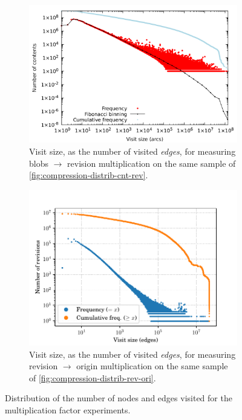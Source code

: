 \begin{figure}
    \begin{subfigure}{.49\textwidth}
        \centering
        \includegraphics[width=\linewidth]{img/compression/distributions/contents_arc_size}
        \caption{Visit size, as the number of visited \emph{edges}, for
            measuring blobs $\to$ revision multiplication on the same sample of
        \cref{fig:compression-distrib-cnt-rev}.}%
        \label{fig:compression-size-cnt-rev-arc}
    \end{subfigure}\hfill%
    \begin{subfigure}{.49\textwidth}
        \centering
        \includegraphics[width=\linewidth]{img/compression/distributions/revisions_arc_size}
        \caption{Visit size, as the number of visited \emph{edges}, for
            measuring revision $\to$ origin multiplication on the same sample
            of \cref{fig:compression-distrib-rev-ori}.}%
        \label{fig:compression-size-rev-ori-arc}
    \end{subfigure}
    \caption{Distribution of the number of nodes and edges visited for the
    multiplication factor experiments.}
\end{figure}

